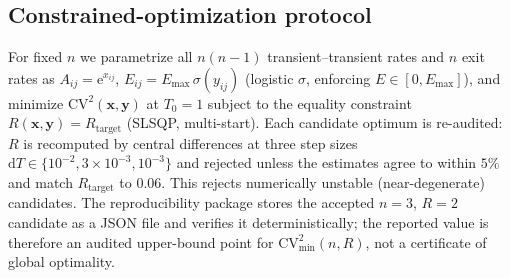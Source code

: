 \documentclass[11pt,onecolumn]{article}
\theoremstyle{definition}
\newcommand{\CV}{\mathrm{CV}}
\newcommand{\Emax}{E_{\max}}
\newcommand{\dd}{\mathrm{d}}
\newcommand{\ee}{\mathrm{e}}
\newcommand{\Tzero}{T_0}
\begin{document}
\subsection{Constrained-optimization protocol}
\label{app:A8}
For fixed $n$ we parametrize all $n(n-1)$ transient--transient rates and $n$ exit rates as $A_{ij}=\ee^{x_{ij}}$, $E_{ij}=\Emax\,\sigma(y_{ij})$ (logistic $\sigma$, enforcing $E\in[0,\Emax]$), and minimize $\CV^2(\mathbf x,\mathbf y)$ at $\Tzero=1$ subject to the equality constraint $R(\mathbf x,\mathbf y)=R_{\mathrm{target}}$ (SLSQP, multi-start). Each candidate optimum is re-audited: $R$ is recomputed by central differences at three step sizes $\dd T\in\{10^{-2},3\!\times\!10^{-3},10^{-3}\}$ and rejected unless the estimates agree to within $5\%$ and match $R_{\mathrm{target}}$ to $0.06$. This rejects numerically unstable (near-degenerate) candidates. The reproducibility package stores the accepted $n=3$, $R=2$ candidate as a JSON file and verifies it deterministically; the reported value is therefore an audited upper-bound point for $\CV^2_{\min}(n,R)$, not a certificate of global optimality.
\end{document}
